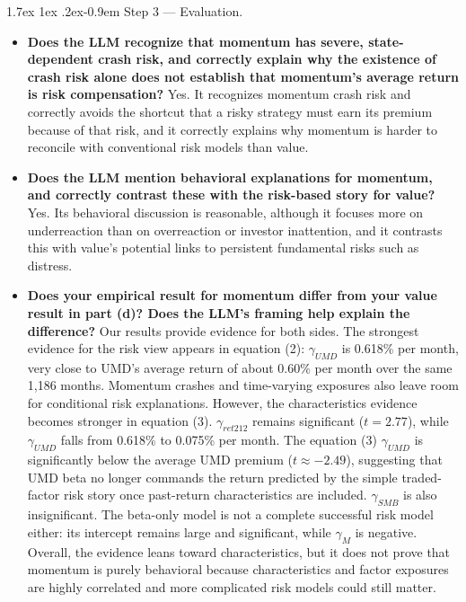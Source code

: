 \documentclass[11pt]{article}
\makeatletter
\renewcommand\paragraph{\@startsection{paragraph}{4}{0pt}%
  {1.7ex \@plus 1ex \@minus .2ex}{-0.9em}%
  {\normalfont\bfseries\normalsize\color{psink}}}
\newenvironment{tight}
  {\begin{itemize}\setlength{\itemsep}{3pt}\setlength{\parskip}{0pt}%
   \setlength{\topsep}{3pt}\setlength{\leftmargini}{1.4em}}
  {\end{itemize}}
\makeatother
\begin{document}
\paragraph{Step 3 --- Evaluation.}
\begin{tight}
  \item \textbf{Does the LLM recognize that momentum has severe, state-dependent crash
  risk, and correctly explain why the existence of crash risk alone does not establish
  that momentum's average return is risk compensation?} Yes. It recognizes momentum crash
  risk and correctly avoids the shortcut that a risky strategy must earn its premium
  because of that risk, and it correctly explains why momentum is harder to reconcile with
  conventional risk models than value.
  \item \textbf{Does the LLM mention behavioral explanations for momentum, and correctly
  contrast these with the risk-based story for value?} Yes. Its behavioral discussion is
  reasonable, although it focuses more on underreaction than on overreaction or investor
  inattention, and it contrasts this with value's potential links to persistent
  fundamental risks such as distress.
  \item \textbf{Does your empirical result for momentum differ from your value result in
  part (d)? Does the LLM's framing help explain the difference?} Our results provide
  evidence for both sides. The strongest evidence for the risk view appears in equation
  (2): $\gamma_{UMD}$ is 0.618\% per month, very close to UMD's average return of about
  0.60\% per month over the same 1,186 months. Momentum crashes and time-varying exposures
  also leave room for conditional risk explanations. However, the characteristics
  evidence becomes stronger in equation (3). $\gamma_{ret212}$ remains significant
  ($t = 2.77$), while $\gamma_{UMD}$ falls from 0.618\% to 0.075\% per month. The equation
  (3) $\gamma_{UMD}$ is significantly below the average UMD premium ($t \approx -2.49$),
  suggesting that UMD beta no longer commands the return predicted by the simple
  traded-factor risk story once past-return characteristics are included. $\gamma_{SMB}$
  is also insignificant. The beta-only model is not a complete successful risk model
  either: its intercept remains large and significant, while $\gamma_M$ is negative.
  Overall, the evidence leans toward characteristics, but it does not prove that momentum
  is purely behavioral because characteristics and factor exposures are highly correlated
  and more complicated risk models could still matter.


\end{tight}
\end{document}
